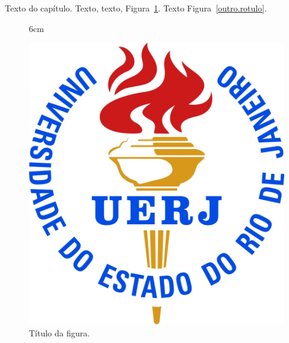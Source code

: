 \documentclass[a4paper,12pt,oneside,onecolumn,final,fleqn]{config/repUERJ}
\begin{document}
Texto do capítulo. Texto, texto, Figura~\ref{rotulo}. Texto Figura~\ref{outro.rotulo}.


\begin{figure}[!ht]{6cm}
  \caption{Título da figura.} \label{rotulo}
  \includegraphics[width=\hsize]{images/logo_uerj_cor.jpg}
\end{figure}
\end{document}
